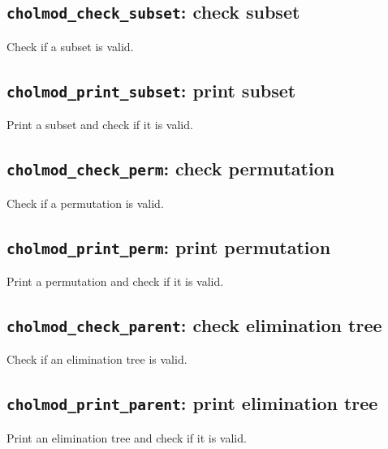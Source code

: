 \documentclass[11pt]{article}
\begin{document}
\subsection{{\tt cholmod\_check\_subset}: check subset}


Check if a subset is valid.

\subsection{{\tt cholmod\_print\_subset}: print subset}


Print a subset and check if it is valid.

\subsection{{\tt cholmod\_check\_perm}: check permutation}


Check if a permutation is valid.

\subsection{{\tt cholmod\_print\_perm}: print permutation}


Print a permutation and check if it is valid.

\subsection{{\tt cholmod\_check\_parent}: check elimination tree}


Check if an elimination tree is valid.

\subsection{{\tt cholmod\_print\_parent}: print elimination tree}


Print an elimination tree and check if it is valid.
\end{document}
